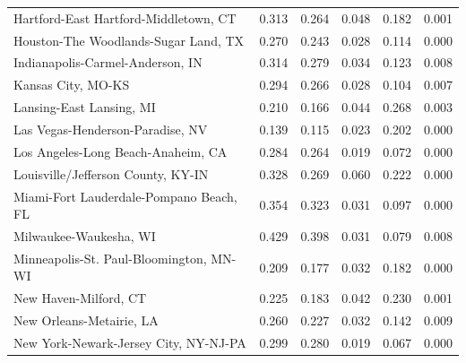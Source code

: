 \begin{longtable}{lrrrrr}
       Hartford-East Hartford-Middletown, CT &              0.313 &              0.264 &                 0.048 &           0.182 &       0.001 \\
        Houston-The Woodlands-Sugar Land, TX &              0.270 &              0.243 &                 0.028 &           0.114 &       0.000 \\
            Indianapolis-Carmel-Anderson, IN &              0.314 &              0.279 &                 0.034 &           0.123 &       0.008 \\
                          Kansas City, MO-KS &              0.294 &              0.266 &                 0.028 &           0.104 &       0.007 \\
                    Lansing-East Lansing, MI &              0.210 &              0.166 &                 0.044 &           0.268 &       0.003 \\
            Las Vegas-Henderson-Paradise, NV &              0.139 &              0.115 &                 0.023 &           0.202 &       0.000 \\
          Los Angeles-Long Beach-Anaheim, CA &              0.284 &              0.264 &                 0.019 &           0.072 &       0.000 \\
          Louisville/Jefferson County, KY-IN &              0.328 &              0.269 &                 0.060 &           0.222 &       0.000 \\
     Miami-Fort Lauderdale-Pompano Beach, FL &              0.354 &              0.323 &                 0.031 &           0.097 &       0.000 \\
                      Milwaukee-Waukesha, WI &              0.429 &              0.398 &                 0.031 &           0.079 &       0.008 \\
     Minneapolis-St. Paul-Bloomington, MN-WI &              0.209 &              0.177 &                 0.032 &           0.182 &       0.000 \\
                       New Haven-Milford, CT &              0.225 &              0.183 &                 0.042 &           0.230 &       0.001 \\
                    New Orleans-Metairie, LA &              0.260 &              0.227 &                 0.032 &           0.142 &       0.009 \\
       New York-Newark-Jersey City, NY-NJ-PA &              0.299 &              0.280 &                 0.019 &           0.067 &       0.000 \\

\end{longtable}
